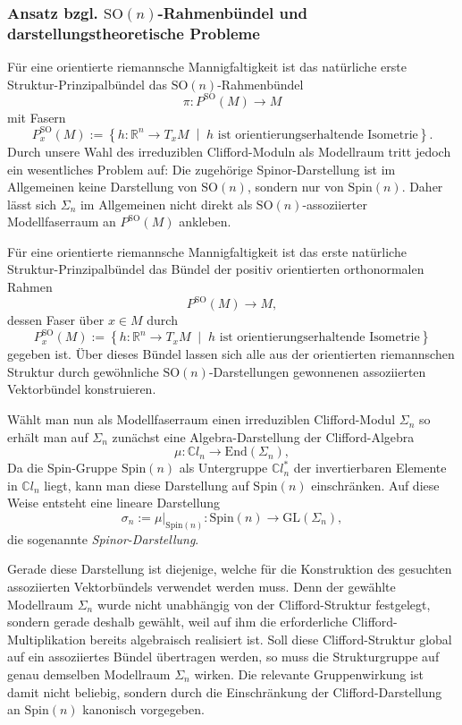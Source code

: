 \documentclass[10pt, letterpaper]{article}
\newcommand{\R}{\mathbb{R}}
\newcommand{\C}{\mathbb{C}}
\newcommand{\End}{\mathrm{End}}
\newcommand{\GL}{\mathrm{GL}}
\newcommand{\SO}{\mathrm{SO}}
\newcommand{\Spin}{\mathrm{Spin}}
\begin{document}
\subsubsection{Ansatz bzgl. $\SO(n)$-Rahmenbündel und darstellungstheoretische Probleme}

Für eine orientierte riemannsche Mannigfaltigkeit ist das natürliche erste
Struktur-Prinzipalbündel das \(\SO(n)\)-Rahmenbündel 
$$\pi: P^{\SO}(M)\to M$$
mit Fasern
\[P_x^{\SO}(M):=\left\{h:\R^n\to T_xM\;\middle|\;h \text{ ist orientierungserhaltende Isometrie}\right\}.\]
Durch unsere Wahl des irreduziblen Clifford-Moduln als Modellraum tritt jedoch ein wesentliches Problem auf: Die zugehörige Spinor-Darstellung ist im Allgemeinen keine
Darstellung von \(\SO(n)\), sondern nur von \(\Spin(n)\). Daher lässt sich
\(\Sigma_n\) im Allgemeinen nicht direkt als \(\SO(n)\)-assoziierter
Modellfaserraum an \(P^{\SO}(M)\) ankleben.

Für eine orientierte riemannsche Mannigfaltigkeit ist das erste natürliche
Struktur-Prinzipalbündel das Bündel der positiv orientierten orthonormalen
Rahmen
\[
P^{\SO}(M)\to M,
\]
dessen Faser über \(x\in M\) durch
\[
P_x^{\SO}(M)
:=
\left\{
h:\R^n\to T_xM
\;\middle|\;
h \text{ ist orientierungserhaltende Isometrie}
\right\}
\]
gegeben ist. Über dieses Bündel lassen sich alle aus der orientierten
riemannschen Struktur durch gewöhnliche \(\SO(n)\)-Darstellungen gewonnenen
assoziierten Vektorbündel konstruieren.

Wählt man nun als Modellfaserraum einen irreduziblen
Clifford-Modul \(\Sigma_n\) so erhält man auf \(\Sigma_n\) zunächst eine Algebra-Darstellung der Clifford-Algebra
\[
\mu:\C l_n \to \End(\Sigma_n),
\]
Da die Spin-Gruppe \(\Spin(n)\) als Untergruppe $\C l_n^*$ der invertierbaren Elemente in
\(\C l_n\) liegt, kann man diese Darstellung auf \(\Spin(n)\) einschränken.
Auf diese Weise entsteht eine lineare Darstellung
\[
\sigma_n:=\mu|_{\Spin(n)}:\Spin(n)\to \GL(\Sigma_n),
\]
die sogenannte \emph{Spinor-Darstellung}.

Gerade diese Darstellung ist diejenige, welche für die Konstruktion des
gesuchten assoziierten Vektorbündels verwendet werden muss. Denn der gewählte
Modellraum \(\Sigma_n\) wurde nicht unabhängig von der Clifford-Struktur
festgelegt, sondern gerade deshalb gewählt, weil auf ihm die erforderliche
Clifford-Multiplikation bereits algebraisch realisiert ist. Soll diese
Clifford-Struktur global auf ein assoziiertes Bündel übertragen werden, so muss
die Strukturgruppe auf genau demselben Modellraum \(\Sigma_n\) wirken. Die
relevante Gruppenwirkung ist damit nicht beliebig, sondern durch die
Einschränkung der Clifford-Darstellung an \(\Spin(n)\) kanonisch vorgegeben.
\end{document}
